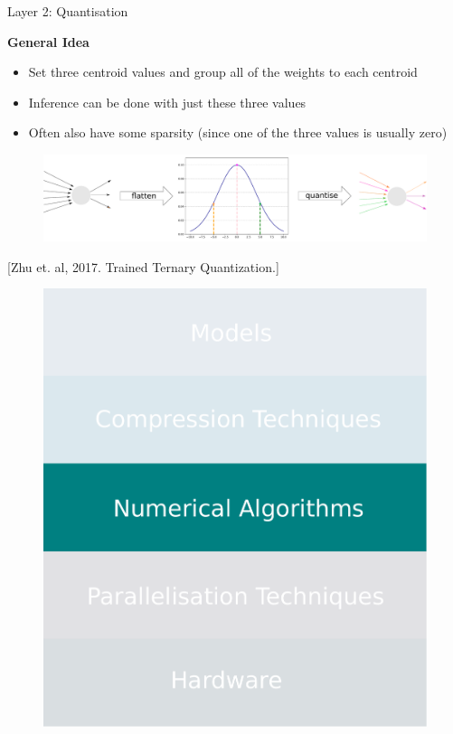 \documentclass[xcolor=dvipsnames]{beamer}
\begin{document}
\begin{frame}{Layer 2: Quantisation}


{\large\textbf{General Idea}}
\begin{itemize}
    \item Set three centroid values and group all of the weights to each centroid
    \item Inference can be done with just these three values
    \item Often also have some sparsity (since one of the three values is usually zero)
\end{itemize}

\begin{figure}
    \centering
    \includegraphics[width=\linewidth]{images/quantization_pipeline.pdf}
\end{figure}
    
{\footnotesize [Zhu et. al, 2017. Trained Ternary Quantization.]}    

\end{frame}


\begin{frame}

\begin{figure}
    \centering
    \includegraphics[width=0.6\linewidth]{images/numericals.pdf}
\end{figure}
    
\end{frame}
\end{document}
